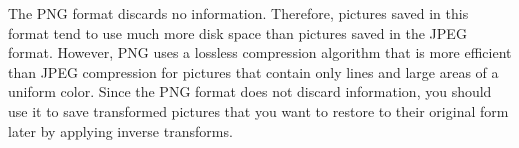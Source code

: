 \documentclass[a4paper]{article}
\newcommand{\BouMaton}{\textsf{BouMaton}\xspace}
\newcommand{\menu}[1]{\textsf{\textbf{#1}}}
\begin{document}
  The PNG format discards no information. Therefore, pictures saved 
  in this format tend to use much more disk space than pictures saved 
  in the JPEG format. However, PNG uses a lossless compression 
  algorithm that is more efficient than JPEG compression for pictures 
  that contain only lines and large areas of a uniform color. Since 
  the PNG format does not discard information, you should use it to 
  save transformed pictures that you want to restore to their 
  original form later by applying inverse transforms.
  
  
\end{document}
